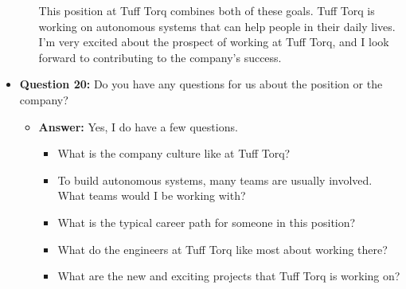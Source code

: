 \documentclass{article}
\begin{document}
\begin{itemize}
\begin{itemize}
        This position at Tuff Torq combines both of these goals. Tuff Torq is working on
        autonomous systems that can help people in their daily lives.
        I'm very excited about the prospect of working at Tuff Torq, and I
        look forward to contributing to the company's success.
    \end{itemize}
    
    \item \textbf{Question 20:} Do you have any questions for us about the position or the company?
    \begin{itemize}
        \item \textbf{Answer:} Yes, I do have a few questions.
        \begin{itemize}
            \item What is the company culture like at Tuff Torq?
            \item To build autonomous systems, many teams are usually involved. What
            teams would I be working with?
            \item What is the typical career path for someone in this position?
            \item What do the engineers at Tuff Torq like most about working there?
            \item What are the new and exciting projects that Tuff Torq is working on?
        \end{itemize}
    \end{itemize}
\end{itemize}
\end{document}
